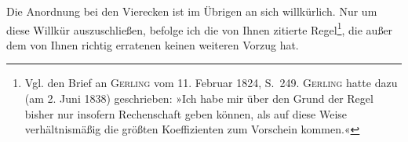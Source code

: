 Die Anordnung bei den Vierecken ist im Übrigen an sich willkürlich. Nur um
diese Willkür auszuschließen, befolge ich die von Ihnen zitierte
Regel\def\letterfivestars{***}\footnote{Vgl. den Brief an \textsc{Gerling} vom 11. Februar 1824, S.\ 249. \textsc{Gerling} hatte dazu
(am 2. Juni 1838) geschrieben: »Ich habe mir über den Grund der Regel bisher nur
insofern Rechenschaft geben können, als auf diese Weise verhältnismäßig die größten
Koeffizienten zum Vorschein kommen.«}, die außer dem von Ihnen richtig
erratenen keinen weiteren Vorzug hat.
\endgroup
